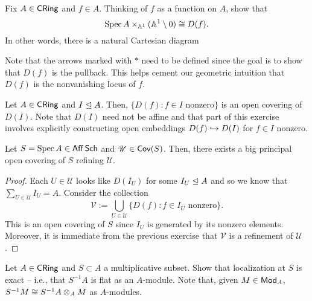 \documentclass[11pt]{article}
\newcommand{\U}{\mathscr{U}}
\newcommand{\V}{\mathscr{V}}
\begin{document}
\begin{exercise}
Fix $A\in\operatorname{\mathsf{CRing}}$ and $f\in A$. Thinking of $f$ as a function on $A$, show that 
$$\operatorname{Spec} A\times_{\mathbb{A}^1}(\mathbb{A}^1\setminus0)\cong D(f).$$
In other words, there is a natural Cartesian diagram
\begin{center}
\end{center}
Note that the arrows marked with $*$ need to be defined since the goal is to show that $D(f)$ is the pullback. This helps cement our geometric intuition that $D(f)$ is the nonvanishing locus of $f$.
\end{exercise}

\begin{exercise}
Let $A\in\operatorname{\mathsf{CRing}}$ and $I\trianglelefteq A$. Then, $\{D(f) : f\in I\textrm{ nonzero}\}$ is an open covering of $D(I)$. Note that $D(I)$ need not be affine and that part of this exercise involves explicitly constructing open embeddings $D(f)\hookrightarrow D(I)$ for $f\in I$ nonzero.
\end{exercise}

\begin{proposition}
Let $S=\operatorname{Spec} A\in\operatorname{\mathsf{Aff}}\operatorname{\mathsf{Sch}}$ and $\U\in\Cov(S)$. Then, there exists a big principal open covering of $S$ refining $\U$.
\end{proposition}

\begin{proof}
Each $U\in\U$ looks like $D(I_U)$ for some $I_U\trianglelefteq A$ and so we know that $\sum_{U\in\U}I_U=A$. Consider the collection
$$\V:=\bigcup_{U\in\U}\{D(f) : f\in I_U\textrm{ nonzero}\}.$$
This is an open covering of $S$ since $I_U$ is generated by its nonzero elements. Moreover, it is immediate from the previous exercise that $\V$ is a refinement of $\U$.
\end{proof}

\begin{exercise}
Let $A\in\operatorname{\mathsf{CRing}}$ and $S\subset A$ a multiplicative subset. Show that localization at $S$ is exact -- i.e., that $S^{-1}A$ is flat as an $A$-module. Note that, given $M\in\operatorname{\mathsf{Mod}}_A$, $S^{-1}M\cong S^{-1}A\otimes_AM$ as $A$-modules.
\end{exercise}
\end{document}
